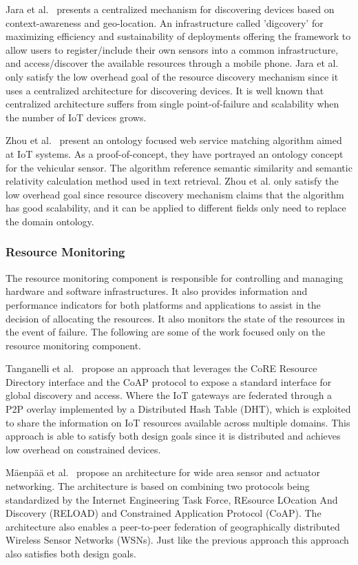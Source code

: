 Jara et al.~\cite{6550579} presents a centralized mechanism for discovering devices based on context-awareness and geo-location. An infrastructure called 'digcovery' for maximizing efficiency and sustainability of deployments offering the framework to allow users to register/include their own sensors into a common infrastructure, and access/discover the available resources through a mobile phone. Jara et al. only satisfy the low overhead goal of the resource discovery mechanism since it uses a centralized architecture for discovering devices. It is well known that centralized architecture suffers from single point-of-failure and scalability when the number of IoT devices grows. 

Zhou et al.~\cite{6664533} present an ontology focused web service matching algorithm aimed at IoT systems. As a proof-of-concept, they have portrayed an ontology concept for the vehicular sensor. The algorithm reference semantic similarity and semantic relativity calculation method used in text retrieval. Zhou et al. only satisfy the low overhead goal since resource discovery mechanism claims that the algorithm has good scalability, and it can be applied to different fields only need to replace the domain ontology.

\subsubsection{Resource Monitoring}
The resource monitoring component is responsible for controlling and managing hardware and software infrastructures. It also provides information and performance indicators for both platforms and applications to assist in the decision of allocating the resources. It also monitors the state of the resources in the event of failure. The following are some of the work focused only on the resource monitoring component.

Tanganelli et al.~\cite{8086146} propose an approach that leverages the CoRE Resource Directory interface and the CoAP protocol to expose a standard interface for global discovery and access. Where the IoT gateways are federated through a P2P overlay implemented by a Distributed Hash Table (DHT), which is exploited to share the information on IoT resources available across multiple domains. This approach is able to satisfy both design goals since it is distributed and achieves low overhead on constrained devices.

M{\"a}enp{\"a}{\"a} et al.~\cite{Maenpaa2012} propose an architecture for wide area sensor and actuator networking. The architecture is based on combining two protocols being standardized by the Internet Engineering Task Force, REsource LOcation And Discovery (RELOAD) and Constrained Application Protocol (CoAP). The architecture also enables a peer-to-peer federation of geographically distributed Wireless Sensor Networks (WSNs). Just like the previous approach this approach also satisfies both design goals.

